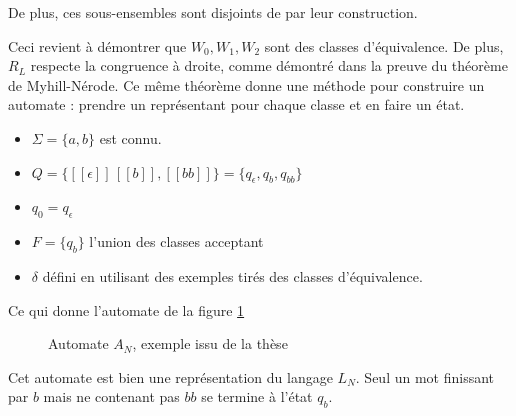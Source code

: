 De plus, ces sous-ensembles sont disjoints de par leur construction.

Ceci revient à démontrer que $W_0,W_1,W_2$ sont des classes d'équivalence. De plus, $R_L$ respecte la congruence à droite, comme démontré dans la preuve du théorème de Myhill-Nérode. Ce même théorème donne une méthode pour construire un automate : prendre un représentant pour chaque classe et en faire un état.

\begin{itemize}
 \item $\Sigma=\{a,b\}$ est connu.
 \item $Q=\{[[\epsilon]]\, [[b]], [[bb]]\} = \{q_\epsilon, q_b, q_{bb}\}$
 \item $q_0 = q_\epsilon$
 \item $F = \{q_b\}$ l'union des classes acceptant
 \item $\delta$ défini en utilisant des exemples tirés des classes d'équivalence.
\end{itemize}

Ce qui donne l'automate de la figure \ref{fig:an}

\begin{figure}[H]
 \centering
 \caption{Automate $A_N$, exemple issu de la thèse\cite{Neider14}}\label{fig:an}
\end{figure}

Cet automate est bien une représentation du langage $L_N$. Seul un mot finissant par $b$ mais ne contenant pas $bb$ se termine à l'état $q_b$.
